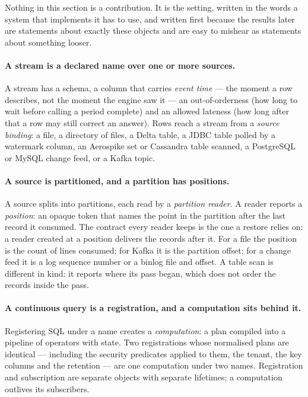 \documentclass[11pt,a4paper]{article}
\renewcommand{\_}{\oldunderscore\allowbreak}
\begin{document}
Nothing in this section is a contribution. It is the setting, written in the words a system that
implements it has to use, and written first because the results later are statements about exactly
these objects and are easy to mishear as statements about something looser.

\paragraph{A stream is a declared name over one or more sources.} A stream has a schema, a column
that carries \emph{event time} --- the moment a row describes, not the moment the engine saw it ---
an out-of-orderness (how long to wait before calling a period complete) and an allowed lateness (how
long after that a row may still correct an answer). Rows reach a stream from a \emph{source binding}:
a file, a directory of files, a Delta table, a JDBC table polled by a watermark column, an Aerospike
set or Cassandra table scanned, a PostgreSQL or MySQL change feed, or a Kafka topic.

\paragraph{A source is partitioned, and a partition has positions.} A source splits into partitions,
each read by a \emph{partition reader}. A reader reports a \emph{position}: an opaque token that
names the point in the partition after the last record it consumed. The contract every reader keeps
is the one a restore relies on: a reader created at a position delivers the records after it. For
a file the position is the count of lines consumed; for Kafka it is the partition offset; for a
change feed it is a log sequence number or a binlog file and offset. A table scan is different in
kind: it reports where its pass began, which does not order the records inside the pass.

\paragraph{A continuous query is a registration, and a computation sits behind it.} Registering SQL
under a name creates a \emph{computation}: a plan compiled into a pipeline of operators with state.
Two registrations whose normalised plans are identical --- including the security predicates applied
to them, the tenant, the key columns and the retention --- are one computation under two names.
Registration and subscription are separate objects with separate lifetimes; a computation outlives
its subscribers.
\end{document}
